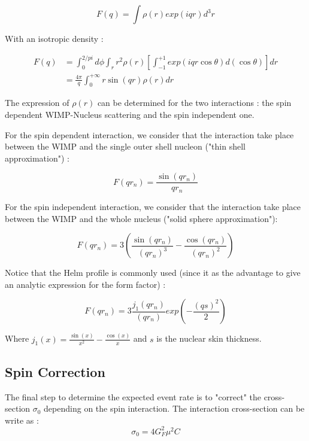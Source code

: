 \documentclass[a4paper, twoside, openany, 11pt]{book}
\begin{document}
\begin{equation}
F(q) = \int \rho (r) exp(iqr) d^3r
\end{equation}

With an isotropic density : 

\begin{align*}
F(q) &= \int_{0}^{2 /pi} d\phi \int_{r} r^2 \rho (r) \left[ \int_{-1}^{+1} exp(iqr \cos \theta) d(\cos\theta)\right]  dr \\
&= \frac{4\pi }{q} \int_{0}^{+\infty} r \sin (qr) \rho (r) dr
\end{align*}

The expression of $\rho(r)$ can be determined for the two interactions : the spin dependent WIMP-Nucleus scattering and the spin independent one. 


For the spin dependent interaction, we consider that the interaction take place between the WIMP and the single outer shell nucleon ("thin shell approximation") : 

\begin{equation}
F(qr_n)= \frac{\sin(qr_n)}{q r_n}
\end{equation} 

For the spin independent interaction, we consider that the interaction take place between the WIMP and the whole nucleus ("solid sphere approximation"):

\begin{equation}
F(qr_n)= 3(\frac{\sin(qr_n)}{(q r_n)^3}- \frac{\cos(qr_n)}{(q r_n)^2})
\end{equation} 

Notice that the Helm profile is commonly used (since it as the advantage to give an analytic expression for the form factor) : 

\begin{equation}
F(qr_n)= 3 \frac{j_1(qr_n)}{(q r_n)} exp(-\frac{(qs)^2}{2})
\end{equation} 

Where $j_1 (x) = \frac{\sin (x)}{x^2} -\frac{\cos (x)}{x} $ and $s$ is the nuclear skin thickness.

\subsection{Spin Correction}

The final step to determine the expected event rate is to "correct" the cross-section $\sigma_0$ depending on the spin interaction. The interaction cross-section can be write as : 
\begin{equation}
\sigma_0 = 4 G_F^2 \mu^2 C
\end{equation}
\end{document}
